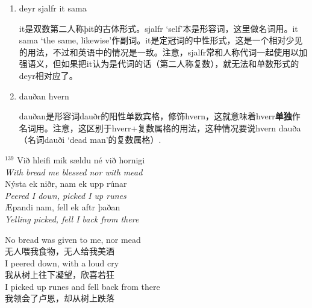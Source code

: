 \begin{grammar*}{}
    \begin{enumerate}[leftmargin=*]

        \item deyr sjalfr it sama

              it是双数第二人称þit的古体形式。sjalfr `self'本是形容词，这里做名词用。it sama
              `the same, likewise'作副词。it是定冠词的中性形式，这是一个相对少见的用法，不过和英语中的情况是一致。注意，sjalfr常和人称代词一起使用以加强语义，但如果把it认为是代词的话（第二人称复数），就无法和单数形式的deyr相对应了。

        \item dauðan hvern

              dauðan是形容词dauðr的阳性单数宾格，修饰hvern，这就意味着hverr\textbf{单独}作名词用。注意，这区别于hverr+复数属格的用法，这种情况要说hvern dauða（名词dauði `dead man'的复数属格）.

    \end{enumerate}
\end{grammar*}
\medskip %
\begin{paracol}{2}
    \noindent
    $^{139}$ Við hleifi mik sældu né við hornigi\\
    \textit{With bread me blessed nor with mead}\\
    Nýsta ek niðr, nam ek upp rúnar\\
    \textit{Peered I down, picked I up runes}\\
    \MakeUppercase æpandi nam, fell ek aftr þaðan\\
    \textit{Yelling picked, fell I back from there}\\
    \switchcolumn

    \noindent
    No bread was given to me, nor mead\\
    无人喂我食物，无人给我美酒\\
    I peered down, with a loud cry\\
    我从树上往下凝望，欣喜若狂\\
    I picked up runes and fell back from there\\
    我领会了卢恩，却从树上跌落\\

\end{paracol}

